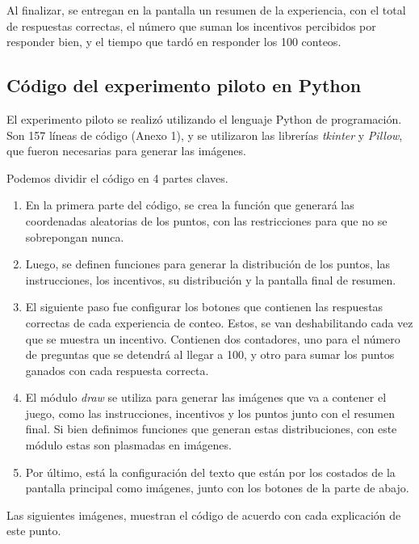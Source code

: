 \documentclass[11pt,letterpaper]{article}
\begin{document}
Al finalizar, se entregan en la pantalla un resumen de la experiencia, con el total de respuestas correctas, el número que suman los incentivos percibidos por responder bien, y el tiempo que tardó en responder los 100 conteos.

\subsection{Código del experimento piloto en Python}

El experimento piloto se realizó utilizando el lenguaje Python de programación. Son 157 líneas de código (Anexo 1), y se utilizaron las librerías \textit{tkinter} y \textit{Pillow}, que fueron necesarias para generar las imágenes.

Podemos dividir el código en 4 partes claves.

\begin{enumerate}

\item En la primera parte del código, se crea la función que generará las coordenadas aleatorias de los puntos, con las restricciones para que no se sobrepongan nunca.
\item Luego, se definen funciones para generar la distribución de los puntos, las instrucciones, los incentivos, su distribución y la pantalla final de resumen.
\item El siguiente paso fue configurar los botones que contienen las respuestas correctas de cada experiencia de conteo. Estos, se van deshabilitando cada vez que se muestra un incentivo. Contienen dos contadores, uno para el número de preguntas que se detendrá al llegar a 100, y otro para sumar los puntos ganados con cada respuesta correcta. 
\item El módulo \textit{draw} se utiliza para generar las imágenes que va a contener el juego, como las instrucciones, incentivos y los puntos junto con el resumen final. Si bien definimos funciones que generan estas distribuciones, con este módulo estas son plasmadas en imágenes.
\item Por último, está la configuración del texto que están por los costados de la pantalla principal como imágenes, junto con los botones de la parte de abajo. 
\end{enumerate}
Las siguientes imágenes, muestran el código de acuerdo con cada explicación de este punto.
\end{document}
